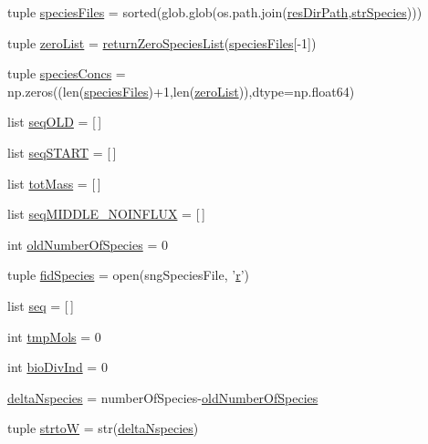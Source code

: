 \begin{DoxyCompactItemize}
\item 
tuple \hyperlink{a00099_af3291bd263282353dd4a12ee38c08cae}{species\-Files} = sorted(glob.\-glob(os.\-path.\-join(\hyperlink{a00099_ab3da7da39258338965b6eef645a913ee}{res\-Dir\-Path},\hyperlink{a00099_ab14d209fe558e83aeede3b657a7241bb}{str\-Species})))
\item 
tuple \hyperlink{a00099_ac2f9e6ead14745bd749a1ab8060cd4e7}{zero\-List} = \hyperlink{a00099_ad7c75c1e146fa51da42274cf7d5747d0}{return\-Zero\-Species\-List}(\hyperlink{a00099_af3291bd263282353dd4a12ee38c08cae}{species\-Files}\mbox{[}-\/1\mbox{]})
\item 
tuple \hyperlink{a00099_a2377568425051a7511b51f7c50662ba1}{species\-Concs} = np.\-zeros((len(\hyperlink{a00099_af3291bd263282353dd4a12ee38c08cae}{species\-Files})+1,len(\hyperlink{a00099_ac2f9e6ead14745bd749a1ab8060cd4e7}{zero\-List})),dtype=np.\-float64)
\item 
list \hyperlink{a00099_a55e3b17fd716a4b1e28e7b9d93f1943c}{seq\-O\-L\-D} = \mbox{[}$\,$\mbox{]}
\item 
list \hyperlink{a00099_a648282264cfc8a40cf84141f9f59781f}{seq\-S\-T\-A\-R\-T} = \mbox{[}$\,$\mbox{]}
\item 
list \hyperlink{a00099_ac2ecae6789d89cc56b0a731065837774}{tot\-Mass} = \mbox{[}$\,$\mbox{]}
\item 
list \hyperlink{a00099_a8fd1a0445b2e641363a96da5a7e7159b}{seq\-M\-I\-D\-D\-L\-E\-\_\-\-N\-O\-I\-N\-F\-L\-U\-X} = \mbox{[}$\,$\mbox{]}
\item 
int \hyperlink{a00099_abe1ce9bb85ee916d2046efc5c3fe6b30}{old\-Number\-Of\-Species} = 0
\item 
tuple \hyperlink{a00099_afd34aa2ef2c410c2d71007bac0a121fd}{fid\-Species} = open(sng\-Species\-File, '\hyperlink{a00024_ac862e7284527eb913b1351c8bfb8e079}{r}')
\item 
list \hyperlink{a00099_a22eec19fcd0da474a136cfe97438ae3b}{seq} = \mbox{[}$\,$\mbox{]}
\item 
int \hyperlink{a00099_aa24f8efad70335a8460f68902001ce64}{tmp\-Mols} = 0
\item 
int \hyperlink{a00099_a247328d05f06695b0c2de9a001ca4548}{bio\-Div\-Ind} = 0
\item 
\hyperlink{a00099_a555117703c3245ec7d3d73f5d991c8c5}{delta\-Nspecies} = number\-Of\-Species-\/\hyperlink{a00099_abe1ce9bb85ee916d2046efc5c3fe6b30}{old\-Number\-Of\-Species}
\item 
tuple \hyperlink{a00099_abe05028c33fab522e3b940195eaaa586}{strto\-W} = str(\hyperlink{a00099_a555117703c3245ec7d3d73f5d991c8c5}{delta\-Nspecies})

\end{DoxyCompactItemize}

